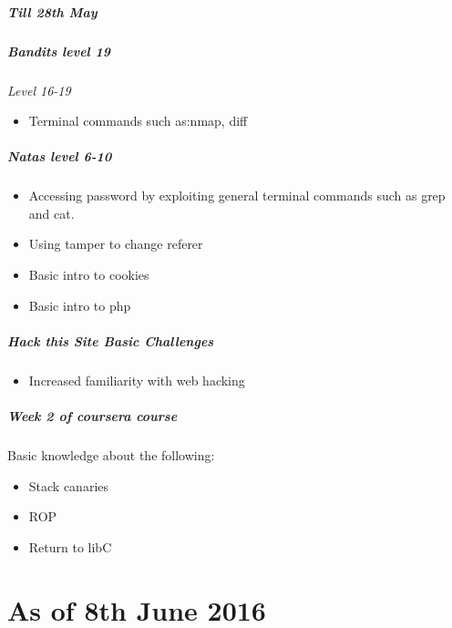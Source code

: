 \documentclass{article}
\begin{document}
\subparagraph{\textit{Till 28th May}}
\subparagraph{Bandits level 19}
    \textit{Level 16-19}
    \begin{itemize}
        \item Terminal commands such as:nmap, diff
    \end{itemize}

\subparagraph{Natas level 6-10}
    \begin{itemize}
        \item Accessing password by exploiting general terminal commands such as grep and cat.
        \item Using tamper to change referer 
        \item Basic intro to cookies
        \item Basic intro to php
    \end{itemize}    
\subparagraph{Hack this Site Basic Challenges}
    \begin{itemize}
        \item Increased familiarity with web hacking
    \end{itemize} 
\subparagraph{Week 2 of coursera course}
    Basic knowledge about the following:
    \begin{itemize}
        \item Stack canaries
        \item ROP
        \item Return to libC
    \end{itemize} 
\newpage
\section*{As of 8th June 2016}
\end{document}
